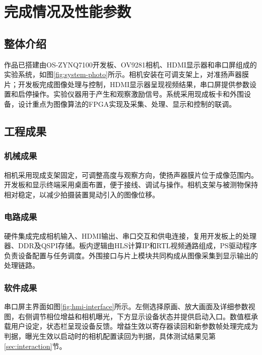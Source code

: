 \section{完成情况及性能参数}
\label{sec:results}

\subsection{整体介绍}
作品已搭建由OS-ZYNQ7100开发板、OV9281相机、HDMI显示器和串口屏组成的实验系统，如图\ref{fig:system-photo}所示。相机安装在可调支架上，对准扬声器膜片；开发板完成图像处理与控制，HDMI显示器呈现视频结果，串口屏提供参数设置和启停操作。实验仪器用于产生和观察激励信号。系统采用现成板卡和外围设备，设计重点为图像算法的FPGA实现及采集、处理、显示和控制的联调。


\subsection{工程成果}
\subsubsection{机械成果}
相机采用现成支架固定，可调整高度与观察方向，使扬声器膜片位于成像范围内。开发板和显示终端采用桌面布置，便于接线、调试与操作。相机支架与被测物保持相对稳定，以减少拍摄装置晃动引入的图像位移。

\subsubsection{电路成果}
硬件集成完成相机输入、HDMI输出、串口交互和供电连接，复用开发板上的处理器、DDR及QSPI存储。板内逻辑由HLS计算IP和RTL视频通路组成，PS驱动程序负责设备配置与任务调度。外围接口与片上模块共同构成从图像采集到显示输出的处理链路。

\subsubsection{软件成果}
串口屏主界面如图\ref{fig:hmi-interface}所示。左侧选择原画、放大画面及详细参数视图，右侧调节相位增益和相机曝光，下方显示设备状态并提供启动入口。数值框承载用户设定，状态栏呈现设备反馈。增益生效以寄存器读回和新参数帧处理完成为判据，曝光生效以启动时的相机配置读回为判据，具体测试结果见第\ref{sec:interaction}节。


